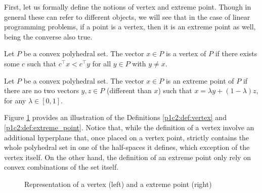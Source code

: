 First, let us formally define the notions of vertex and extreme point. Though in general these can refer to different objects, we will see that in the case of linear programming problems, if a point is a vertex, then it is an extreme point as well, being the converse also true.

\begin{definition}[Vertex] \label{p1c2:def:vertex}
	Let $P$ be a convex polyhedral set. The vector $x \in P$ is a vertex of $P$ if there exists some $c$ such that $c^\top x < c^\top y$ for all $y \in P$ with $y \neq x$.
\end{definition}

\begin{definition}\label{p1c2:def:extreme_point}
	Let $P$ be a convex polyhedral set. The vector $x \in P$ is an extreme point of $P$ if there are no two vectors $y,z \in P$ (different than $x$) such that $x = \lambda y + (1 - \lambda)z$, for any $\lambda \in [0,1]$.
\end{definition}

Figure \ref{p1c2:fig:vertex_and_extreme_point} provides an illustration of the Definitions \ref{p1c2:def:vertex} and \ref{p1c2:def:extreme_point}. Notice that, while the definition of a vertex involve an additional hyperplane that, once placed on a vertex point, strictly contains the whole polyhedral set in one of the half-spaces it defines, which exception of the vertex itself. On the other hand, the definition of an extreme point only rely on convex combinations of the set itself. 

\begin{figure}
	\caption{Representation of a vertex (left) and a extreme point (right)} \label{p1c2:fig:vertex_and_extreme_point}
\end{figure}	


